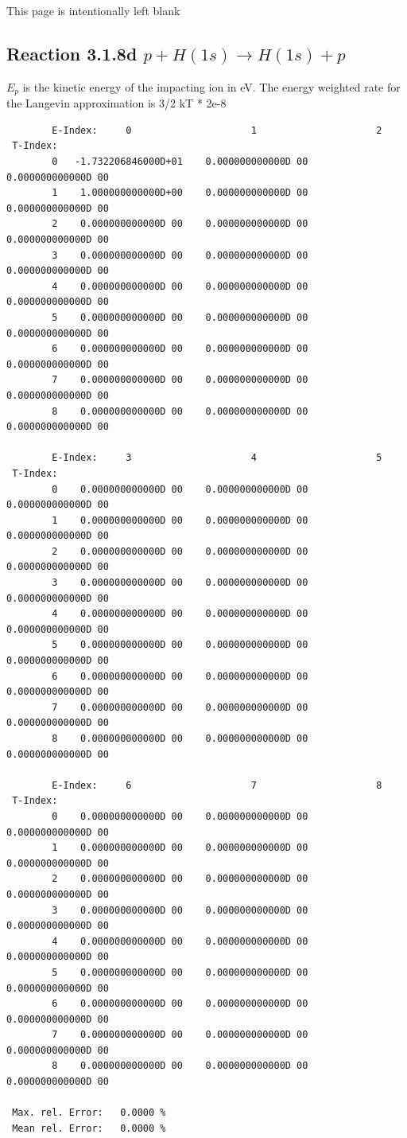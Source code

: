 \documentclass[12pt,dvips]{article}
\begin{document}
\newpage
This page is intentionally left blank
\newpage
\subsection{
Reaction 3.1.8d  $p + H(1s)  \rightarrow  H(1s) + p $
}
$E_p$ is the kinetic energy of the impacting ion in eV.
The energy weighted rate for the Langevin approximation is
3/2 kT * 2e-8

\begin{small}\begin{verbatim}
        E-Index:     0                     1                     2
 T-Index:
        0   -1.732206846000D+01    0.000000000000D 00    0.000000000000D 00
        1    1.000000000000D+00    0.000000000000D 00    0.000000000000D 00
        2    0.000000000000D 00    0.000000000000D 00    0.000000000000D 00
        3    0.000000000000D 00    0.000000000000D 00    0.000000000000D 00
        4    0.000000000000D 00    0.000000000000D 00    0.000000000000D 00
        5    0.000000000000D 00    0.000000000000D 00    0.000000000000D 00
        6    0.000000000000D 00    0.000000000000D 00    0.000000000000D 00
        7    0.000000000000D 00    0.000000000000D 00    0.000000000000D 00
        8    0.000000000000D 00    0.000000000000D 00    0.000000000000D 00

        E-Index:     3                     4                     5
 T-Index:
        0    0.000000000000D 00    0.000000000000D 00    0.000000000000D 00
        1    0.000000000000D 00    0.000000000000D 00    0.000000000000D 00
        2    0.000000000000D 00    0.000000000000D 00    0.000000000000D 00
        3    0.000000000000D 00    0.000000000000D 00    0.000000000000D 00
        4    0.000000000000D 00    0.000000000000D 00    0.000000000000D 00
        5    0.000000000000D 00    0.000000000000D 00    0.000000000000D 00
        6    0.000000000000D 00    0.000000000000D 00    0.000000000000D 00
        7    0.000000000000D 00    0.000000000000D 00    0.000000000000D 00
        8    0.000000000000D 00    0.000000000000D 00    0.000000000000D 00

        E-Index:     6                     7                     8
 T-Index:
        0    0.000000000000D 00    0.000000000000D 00    0.000000000000D 00
        1    0.000000000000D 00    0.000000000000D 00    0.000000000000D 00
        2    0.000000000000D 00    0.000000000000D 00    0.000000000000D 00
        3    0.000000000000D 00    0.000000000000D 00    0.000000000000D 00
        4    0.000000000000D 00    0.000000000000D 00    0.000000000000D 00
        5    0.000000000000D 00    0.000000000000D 00    0.000000000000D 00
        6    0.000000000000D 00    0.000000000000D 00    0.000000000000D 00
        7    0.000000000000D 00    0.000000000000D 00    0.000000000000D 00
        8    0.000000000000D 00    0.000000000000D 00    0.000000000000D 00

 Max. rel. Error:   0.0000 %
 Mean rel. Error:   0.0000 %
\end{verbatim}\end{small}
\end{document}
